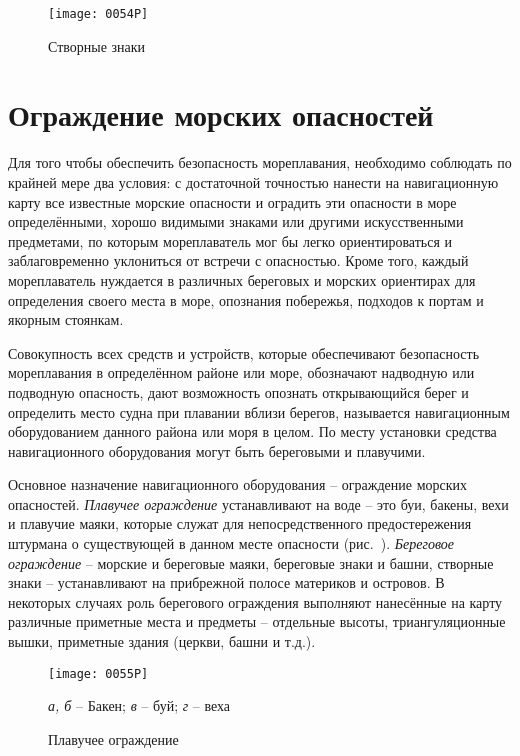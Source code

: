 \begin{wrapfigure}{O}{0.4\textwidth}
  \centering{}
  \texttt{[image: 0054P]}
  \caption{Створные знаки}
  \label{fig:54}
\end{wrapfigure}

\section{Ограждение морских опасностей}

Для того чтобы обеспечить безопасность мореплавания, необходимо
соблюдать по крайней мере два условия: с достаточной точностью нанести
на навигационную карту все известные морские опасности и оградить эти
опасности в море определёнными, хорошо видимыми знаками или другими
искусственными предметами, по которым мореплаватель мог бы легко
ориентироваться и заблаговременно уклониться от встречи с
опасностью. Кроме того, каждый мореплаватель нуждается в различных
береговых и морских ориентирах для определения своего места в море,
опознания побережья, подходов к портам и якорным стоянкам.

Совокупность всех средств и устройств, которые обеспечивают
безопасность мореплавания в определённом районе или море, обозначают
надводную или подводную опасность, дают возможность опознать
открывающийся берег и определить место судна при плавании вблизи
берегов, называется навигационным оборудованием данного района или
моря в целом. По месту установки средства навигационного оборудования
могут быть береговыми и плавучими.

Основное назначение навигационного оборудования \--- ограждение
морских опасностей. \textit{Плавучее ограждение}
 устанавливают на воде \--- это буи,
бакены, вехи и плавучие маяки, которые служат для непосредственного
предостережения штурмана о существующей в данном месте опасности
(рис.~). \textit{Береговое ограждение}
 \--- морские и береговые маяки, береговые
знаки и башни, створные знаки \--- устанавливают на прибрежной полосе
материков и островов. В некоторых случаях роль берегового ограждения
выполняют нанесённые на карту различные приметные места и предметы
\--- отдельные высоты, триангуляционные вышки, приметные здания
(церкви, башни и т.д.).

\begin{figure}[htb]
  \centering{}
  \texttt{[image: 0055P]}
  \caption{Плавучее ограждение}
  \label{fig:55}
  \small
  \centering{}
  \textit{а, б} \--- Бакен; \textit{в} \--- буй; \textit{г} \--- веха
\end{figure}

